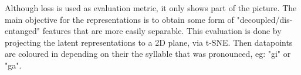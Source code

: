 		
	
	
		Although loss is used as evaluation metric, it only shows part of the picture. The main objective for the representations is to obtain some form of "decoupled/dis-entanged" features that are more easily separable. This evaluation is done by projecting the latent representations to a 2D plane, via t-SNE. Then datapoints are coloured in depending on their the syllable that was pronounced, eg: "gi" or "ga".
		
		
		

	
